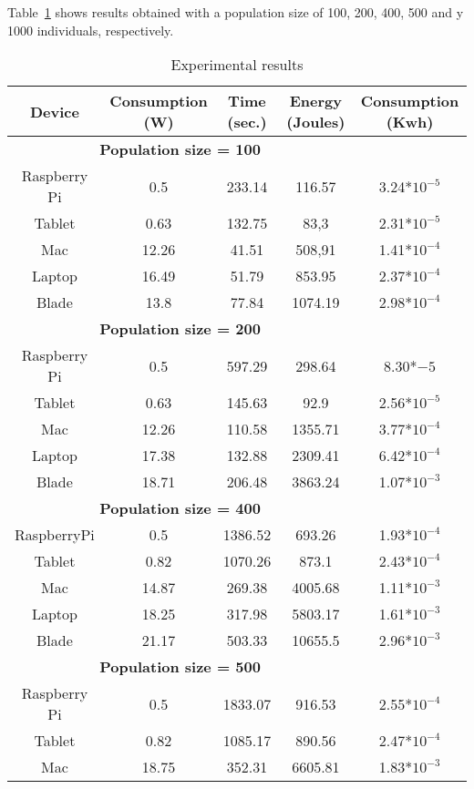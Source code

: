 Table~\ref{Table:result_todos} shows results obtained with a population size of 100, 200, 400, 500 and y 1000 individuals, respectively. 
\begin{small}
 
\begin{table}[!ht]
\renewcommand{\arraystretch}{1.3}
\centering
\caption{Experimental results}
\label{Table:result_todos}
\begin{tabular}{ccccc} \hline
Device & Consumption (W) & Time (sec.) & Energy (Joules) & Consumption (Kwh) \\ \hline
\multicolumn{4}{c}{\textbf{Population size = 100}}\\ %
Raspberry Pi & 0.5 & 233.14 &116.57 & 3.24*$10^{-5}$ \\
Tablet & 0.63 & 132.75 & 83,3&2.31*$10^{-5}$ \\
Mac & 12.26 & 41.51 & 508,91&1.41*$10^{-4}$ \\
Laptop & 16.49 & 51.79 & 853.95& 2.37*$10^{-4}$ \\
Blade & 13.8 & 77.84 & 1074.19&2.98*$10^{-4}$ \\ \hline
\multicolumn{4}{c}{\textbf{Population size = 200}}\\ %
Raspberry Pi &	0.5 &597.29 &298.64 & 8.30*${-5}$ \\
Tablet & 0.63 & 145.63 & 92.9&2.56*$10^{-5}$ \\
Mac & 12.26 & 110.58 & 1355.71&3.77*$10^{-4}$ \\
Laptop	& 17.38 & 132.88 & 2309.41&6.42*$10^{-4}$ \\
Blade & 18.71 & 206.48 & 3863.24&1.07*$10^{-3}$ \\ \hline
\multicolumn{4}{c}{\textbf{Population size = 400}}\\ %
 RaspberryPi&0.5&1386.52& 693.26&1.93*$10^{-4}$ \\
Tablet &0.82&1070.26& 873.1&2.43*$10^{-4}$\\
Mac&14.87&269.38&4005.68&1.11*$10^{-3}$\\
Laptop&18.25&317.98&5803.17 &1.61*$10^{-3}$\\
Blade&21.17&503.33&10655.5&2.96*$10^{-3}$ \\ \hline
\multicolumn{4}{c}{\textbf{Population size = 500}}\\ %
Raspberry Pi & 0.5&1833.07&916.53 &2.55*$10^{-4}$ \\
Tablet & 0.82 & 1085.17& 890.56&2.47*$10^{-4}$ \\
Mac & 18.75 & 352.31 & 6605.81&1.83*$10^{-3}$ \\

\end{tabular}
\end{table}
\end{small}
